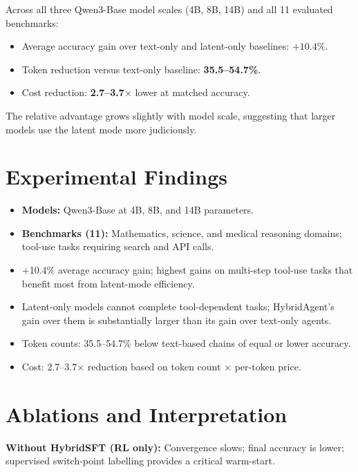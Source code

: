 \documentclass[10pt,twocolumn]{article}
\begin{document}
Across all three Qwen3-Base model scales (4B, 8B, 14B) and all 11
evaluated benchmarks:

\begin{itemize}[itemsep=2pt,parsep=0pt]
  \item Average accuracy gain over text-only and latent-only baselines:
    $\mathbf{+10.4\%}$.
  \item Token reduction versus text-only baseline:
    \textbf{35.5--54.7\%}.
  \item Cost reduction: \textbf{2.7--3.7$\times$} lower at matched accuracy.
\end{itemize}

The relative advantage grows slightly with model scale, suggesting that
larger models use the latent mode more judiciously.

\section{Experimental Findings}

\begin{itemize}[itemsep=2pt,parsep=0pt]
  \item \textbf{Models:} Qwen3-Base at 4B, 8B, and 14B parameters.
  \item \textbf{Benchmarks (11):} Mathematics, science, and medical
    reasoning domains; tool-use tasks requiring search and API calls.
  \item $+$10.4\% average accuracy gain; highest gains on multi-step
    tool-use tasks that benefit most from latent-mode efficiency.
  \item Latent-only models cannot complete tool-dependent tasks;
    HybridAgent's gain over them is substantially larger than its gain
    over text-only agents.
  \item Token counts: 35.5--54.7\% below text-based chains of equal or
    lower accuracy.
  \item Cost: 2.7--3.7$\times$ reduction based on token count $\times$
    per-token price.
\end{itemize}

\section{Ablations and Interpretation}

\textbf{Without HybridSFT (RL only):} Convergence slows; final accuracy
is lower; supervised switch-point labelling provides a critical warm-start.
\end{document}

